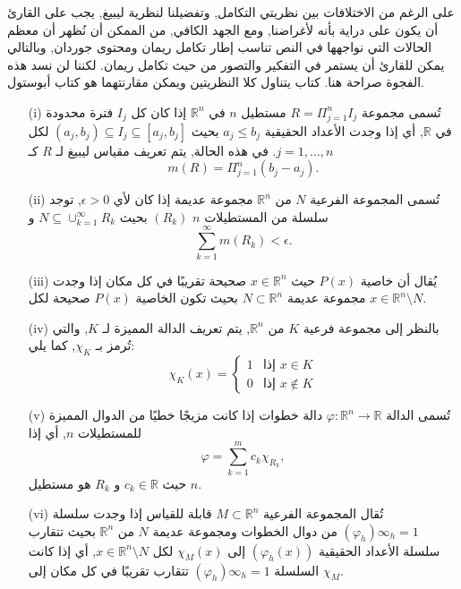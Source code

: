 على الرغم من الاختلافات بين نظريتي التكامل, وتفضيلنا لنظرية ليبيغ, يجب على القارئ أن يكون على دراية بأنه لأغراضنا, ومع الجهد الكافي, من الممكن أن نُظهر أن معظم الحالات التي نواجهها في النص تناسب إطار تكامل ريمان ومحتوى جوردان, وبالتالي يمكن للقارئ أن يستمر في التفكير والتصور من حيث تكامل ريمان. لكننا لن نسد هذه الفجوة صراحة هنا. كتاب يتناول كلا النظريتين ويمكن مقارنتهما هو كتاب أبوستول.

\begin{definition}
\begin{itemize}
    \item [(i)] تُسمى مجموعة \( R = \Pi_{j=1}^n I_j \) مستطيل \( n \) في \( \mathbb{R}^n \) إذا كان كل \( I_j \) فترة محدودة في \( \mathbb{R} \), أي إذا وجدت الأعداد الحقيقية \( a_j \leq b_j \) بحيث \( (a_j, b_j) \subseteq I_j \subseteq [a_j, b_j] \) لكل \( j = 1, \ldots, n \). في هذه الحالة, يتم تعريف مقياس ليبيغ لـ \( R \) كـ
    \[ m(R) = \Pi_{j=1}^n (b_j - a_j). \]
    \item[(ii)] تُسمى المجموعة الفرعية \( N \) من \( \mathbb{R}^n \) مجموعة عديمة إذا كان لأي \( \epsilon > 0 \), توجد سلسلة من المستطيلات \( n \) $(R_k)$ بحيث \( N \subseteq \cup_{k=1}^{\infty} R_k \) و
    \[ \sum_{k=1}^{\infty} m(R_k) < \epsilon. \]
    \item[(iii)] يُقال أن خاصية \( P(x) \) حيث \( x \in \mathbb{R}^n \) صحيحة تقريبًا في كل مكان إذا وجدت مجموعة عديمة \( N \subset \mathbb{R}^n \) بحيث تكون الخاصية \( P(x) \) صحيحة لكل \( x \in \mathbb{R}^n \setminus N \).
    \item[(iv)] بالنظر إلى مجموعة فرعية \( K \) من \( \mathbb{R}^n \), يتم تعريف الدالة المميزة لـ \( K \), والتي تُرمز بـ \( \chi_K \), كما يلي:
    \[ \chi_K(x) = \begin{cases} 
    1 & \text{إذا } x \in K \\
    0 & \text{إذا } x \notin K 
    \end{cases} \]
    \item[(v)] تُسمى الدالة \( \varphi : \mathbb{R}^n \to \mathbb{R} \) دالة خطوات إذا كانت مزيجًا خطيًا من الدوال المميزة للمستطيلات \( n \), أي إذا
    \[ \varphi = \sum_{k=1}^m c_k \chi_{R_k}, \]
حيث \( c_k \in \mathbb{R} \) و \( R_k \) هو مستطيل \( n \).
    \item[(vi)] تُقال المجموعة الفرعية \( M \subset \mathbb{R}^n \) قابلة للقياس إذا وجدت سلسلة $(\varphi_h)\infty_h=1$ من دوال الخطوات ومجموعة عديمة $N$ من \( \mathbb{R}^n \) بحيث تتقارب سلسلة الأعداد الحقيقية $(\varphi_h(x))$ إلى \( \chi_M(x) \) لكل \( x \in \mathbb{R}^n \setminus N \), أي إذا كانت السلسلة $(\varphi_h)\infty_h=1$ 
تتقارب تقريبًا في كل مكان إلى \( \chi_M \).
\end{itemize}
\end{definition}

